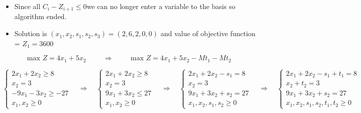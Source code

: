\vspace{0.25cm}

\begin{itemize}
    \item Since all \hspace{0.2cm}\(C_i - Z_{i+1} \leq 0\)\hspace{0.2cm}we can no longer enter a variable to the basis so algorithm ended.
    \item Solution is \((x_1,x_2,s_1,s_2,s_3) = (2,6,2,0,0)\) and value of objective function = \(Z_1 = 3600\)
\end{itemize}

\vspace{1.5cm}

\[\text{max } Z = 4x_1 + 5x_2 \hspace{1cm} \Longrightarrow \hspace{1cm} \text{max } Z = 4x_1 + 5x_2 - Mt_1 - Mt_2\] 

\[
\left\{
\begin{array}{l}
    2x_{1} + 2x_{2} \geq 8 \\
    x_{2} = 3 \\
    -9x_{1} - 3x_{2} \geq -27 \\
    x_{1}, x_{2} \geq 0
\end{array}
\right.
\quad
\Longrightarrow
\quad
\left\{
\begin{array}{l}
    2x_{1} + 2x_{2} \geq 8 \\
    x_{2} = 3 \\
    9x_{1} + 3x_{2} \leq 27 \\
    x_{1}, x_{2} \geq 0
\end{array}
\right.
\quad
\Longrightarrow
\quad
\left\{
\begin{array}{l}
    2x_{1} + 2x_{2} - s_{1} = 8 \\
    x_{2} = 3 \\
    9x_{1} + 3x_{2} + s_{2} = 27 \\
    x_{1}, x_{2}, s_{1}, s_{2} \geq 0
\end{array}
\right.
\quad
\Longrightarrow
\quad
\left\{
\begin{array}{l}
    2x_{1} + 2x_{2} - s_{1} + t_{1}= 8 \\
    x_{2} + t_{2} = 3 \\
    9x_{1} + 3x_{2} + s_{2} = 27 \\
    x_{1}, x_{2}, s_{1}, s_{2}, t_{1}, t_{2} \geq 0
\end{array}
\right.



\]

